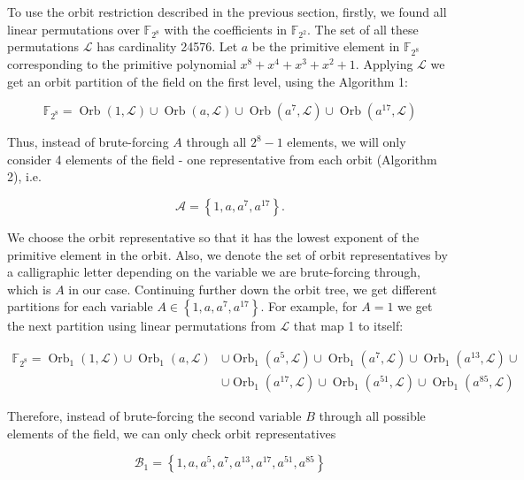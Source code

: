 \documentclass[10pt]{article}
\begin{document}
To use the orbit restriction described in the previous section, firstly, we found all linear permutations over $\mathbb{F}_{2^{8}}$ with the coefficients in $\mathbb{F}_{2^{2}}$. The set of all these permutations $\mathcal{L}$ has cardinality 24576. Let $a$ be the primitive element in $\mathbb{F}_{2^{8}}$ corresponding to the primitive polynomial $x^{8}+x^{4}+x^{3}+x^{2}+1$. Applying $\mathcal{L}$ we get an orbit partition of the field on the first level, using the Algorithm 1:

$$
\mathbb{F}_{2^{8}}=\operatorname{Orb}(1, \mathcal{L}) \cup \operatorname{Orb}(a, \mathcal{L}) \cup \operatorname{Orb}\left(a^{7}, \mathcal{L}\right) \cup \operatorname{Orb}\left(a^{17}, \mathcal{L}\right)
$$

Thus, instead of brute-forcing $A$ through all $2^{8}-1$ elements, we will only consider 4 elements of the field - one representative from each orbit (Algorithm 2), i.e.

$$
\mathcal{A}=\left\{1, a, a^{7}, a^{17}\right\} .
$$

We choose the orbit representative so that it has the lowest exponent of the primitive element in the orbit. Also, we denote the set of orbit representatives by a calligraphic letter depending on the variable we are brute-forcing through, which is $A$ in our case. Continuing further down the orbit tree, we get different partitions for each variable $A \in\left\{1, a, a^{7}, a^{17}\right\}$. For example, for $A=1$ we get the next partition using linear permutations from $\mathcal{L}$ that map 1 to itself:

$$
\begin{aligned}
\mathbb{F}_{2^{8}}=\operatorname{Orb}_{1}(1, \mathcal{L}) \cup \operatorname{Orb}_{1}(a, \mathcal{L}) & \cup \operatorname{Orb}_{1}\left(a^{5}, \mathcal{L}\right) \cup \operatorname{Orb}_{1}\left(a^{7}, \mathcal{L}\right) \cup \operatorname{Orb}_{1}\left(a^{13}, \mathcal{L}\right) \cup \\
& \cup \operatorname{Orb}_{1}\left(a^{17}, \mathcal{L}\right) \cup \operatorname{Orb}_{1}\left(a^{51}, \mathcal{L}\right) \cup \operatorname{Orb}_{1}\left(a^{85}, \mathcal{L}\right)
\end{aligned}
$$

Therefore, instead of brute-forcing the second variable $B$ through all possible elements of the field, we can only check orbit representatives

$$
\mathcal{B}_{1}=\left\{1, a, a^{5}, a^{7}, a^{13}, a^{17}, a^{51}, a^{85}\right\}
$$
\end{document}
